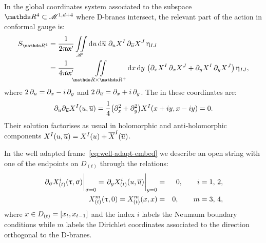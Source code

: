 In the global coordinates system associated to the subspace $\R^4 \subset \ccM^{1, d+4}$ where D-branes intersect, the relevant part of the action in conformal gauge is:
\begin{equation}
  \begin{split}
    S_{\R^4}
    & =
    \frac{1}{2 \pi \ap}
    \iint\limits_{\ccH}
    \dd{u} \dd{\baru}\,
    \ipd{u} X^I\, \ipd{\baru} X^J\,
    \eta_{IJ}
    \\
    & =
    \frac{1}{4 \pi \ap}
    \iint\limits_{\R \times \R^+}
    \dd{x}\dd{y}\,
    \qty(
      \ipd{x} X^I\, \ipd{x} X^J
      +
      \ipd{y} X^I\, \ipd{y} X^J
    )\,
    \eta_{IJ},
  \end{split}
  \label{eq:string_action}
\end{equation}
where $2\, \partial_{u} = \partial_{x} - i\, \partial_{y}$ and $2\, \partial_{\overline{u}} = \partial_{x} + i\, \partial_{y}$.
The \eom in these coordinates are:
\begin{equation}
  \partial_{u} \partial_{\overline{u}} X^I( u, \overline{u} )
  =
  \frac{1}{4}
  \qty( \partial_{x}^2 + \partial_{y}^2 ) X^I( x+iy, x-iy )
  =
  0.
  \label{eq:string_equation_of_motion}
\end{equation}
Their solution factorises as usual in holomorphic and anti-holomorphic components $X^I( u, \overline{u} ) = X^I( u ) + \overline{X}^I( \overline{u} )$.

In the well adapted frame~\eqref{eq:well-adapt-embed} we describe an open string with one of the endpoints on $D_{(t)}$ through the relations:
\begin{eqnarray}
  \eval{\ipd{\sigma} X^i_{(t)}( \tau, \sigma )}_{\sigma = 0}
  =
  \eval{\ipd{y} X^i_{(t)}( u, \baru )}_{y = 0}
  & = &
  0,
  \qquad
  i = 1,\, 2,
  \label{eq:neumann_bc}
  \\
  X^m_{(t)}( \tau, 0 )
  =
  X^m_{(t)}( x, x )
  & = &
  0,
  \qquad
  m = 3,\, 4,
  \label{eq:dirichlet_bc}
\end{eqnarray}
where $x \in D_{(t)} = \qty[ x_t, x_{t-1} ]$ and the index $i$ labels the Neumann boundary conditions while $m$ labels the Dirichlet coordinates associated to the direction orthogonal to the D-branes.

